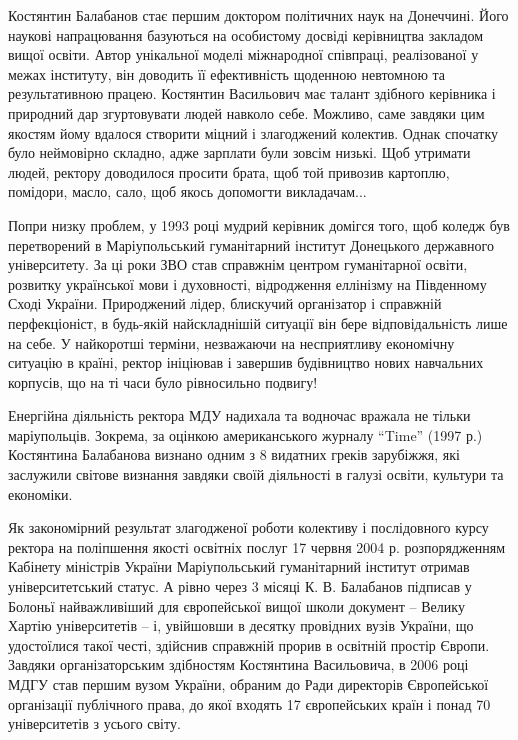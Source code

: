 Костянтин Балабанов стає першим доктором політичних наук на Донеччині. Його
наукові напрацювання базуються на особистому досвіді керівництва закладом вищої
освіти. Автор унікальної моделі міжнародної співпраці, реалізованої у межах
інституту, він доводить її ефективність щоденною невтомною та результативною
працею. Костянтин Васильович має талант здібного керівника і природний дар
згуртовувати людей навколо себе. Можливо, саме завдяки цим якостям йому вдалося
створити міцний і злагоджений колектив. Однак спочатку було неймовірно складно,
адже зарплати були зовсім низькі. Щоб утримати людей, ректору доводилося
просити брата, щоб той привозив картоплю, помідори, масло, сало, щоб якось
допомогти викладачам...

Попри низку проблем, у 1993 році мудрий керівник домігся того, щоб коледж був
перетворений в Маріупольський гуманітарний інститут Донецького державного
університету. За ці роки ЗВО став справжнім центром гуманітарної освіти,
розвитку української мови і духовності, відродження еллінізму на Південному
Сході України. Природжений лідер, блискучий організатор і справжній
перфекціоніст, в будь-якій найскладнішій ситуації він бере відповідальність
лише на себе. У найкоротші терміни, незважаючи на несприятливу економічну
ситуацію в країні, ректор ініціював і завершив будівництво нових навчальних
корпусів, що на ті часи було рівносильно подвигу!

Енергійна діяльність ректора МДУ надихала та водночас вражала не тільки
маріупольців. Зокрема, за оцінкою американського журналу \enquote{Time} (1997 р.)
Костянтина Балабанова визнано одним з 8 видатних греків зарубіжжя, які
заслужили світове визнання завдяки своїй діяльності в галузі освіти, культури
та економіки.


Як закономірний результат злагодженої роботи колективу і послідовного курсу
ректора на поліпшення якості освітніх послуг 17 червня 2004 р. розпорядженням
Кабінету міністрів України Маріупольський гуманітарний інститут отримав
університетський статус. А рівно через 3 місяці К. В. Балабанов підписав у
Болоньї найважливіший для європейської вищої школи документ – Велику Хартію
університетів – і, увійшовши в десятку провідних вузів України, що удостоїлися
такої честі, здійснив справжній прорив в освітній простір Європи. Завдяки
організаторським здібностям Костянтина Васильовича, в 2006 році МДГУ став
першим вузом України, обраним до Ради директорів Європейської організації
публічного права, до якої входять 17 європейських країн і понад 70
університетів з усього світу.

